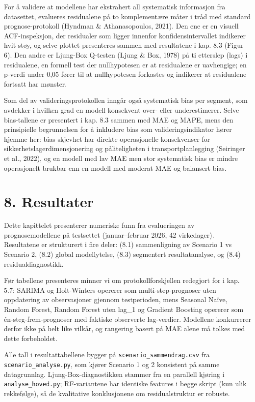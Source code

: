 \documentclass[
  norsk,
  11pt,
  a4paper,
]{article}
\begin{document}
For å validere at modellene har ekstrahert all systematisk informasjon
fra datasettet, evalueres residualene på to komplementære måter i tråd
med standard prognose-protokoll (Hyndman \& Athanasopoulos, 2021). Den
ene er en visuell ACF-inspeksjon, der residualer som ligger innenfor
konfidensintervallet indikerer hvit støy, og selve plottet presenteres
sammen med resultatene i kap. 8.3 (Figur 6). Den andre er Ljung-Box
Q-testen (Ljung \& Box, 1978) på ti etterslep (lags) i residualene, en
formell test der nullhypotesen er at residualene er uavhengige; en
p-verdi under 0,05 fører til at nullhypotesen forkastes og indikerer at
residualene fortsatt har mønster.

Som del av valideringsprotokollen inngår også systematisk bias per
segment, som avdekker i hvilken grad en modell konsekvent over- eller
underestimerer. Selve bias-tallene er presentert i kap. 8.3 sammen med
MAE og MAPE, mens den prinsipielle begrunnelsen for å inkludere bias som
validerings\-indikator hører hjemme her: bias-skjevhet har direkte
operasjonelle konsekvenser for sikkerhetslagerdimensjonering og
påliteligheten i transportplanlegging (Seiringer et al., 2022), og en
modell med lav MAE men stor systematisk bias er mindre operasjonelt
brukbar enn en modell med moderat MAE og balansert bias.

\section{8. Resultater}\label{resultater}

Dette kapittelet presenterer numeriske funn fra evalueringen av
prognosemodellene på testsettet (januar--februar 2026, 42 virkedager).
Resultatene er strukturert i fire deler: (8.1) sammenligning av Scenario
1 vs Scenario 2, (8.2) global modellytelse, (8.3) segmentert
resultatanalyse, og (8.4) residualdiagnostikk.

Før tabellene presenteres minner vi om protokollforskjellen redegjort
for i kap. 5.7: SARIMA og Holt-Winters opererer som multi-step-prognoser
uten oppdatering av observasjoner gjennom testperioden, mens Seasonal
Naïve, Random Forest, Random Forest uten lag\_1 og Gradient Boosting
opererer som én-steg-frem-prognoser med faktiske observerte lag-verdier.
Modellene konkurrerer derfor ikke på helt like vilkår, og rangering
basert på MAE alene må tolkes med dette forbeholdet.

Alle tall i resultattabellene bygger på
\texttt{scenario\_sammendrag.csv} fra \texttt{scenario\_analyse.py}, som
kjører Scenario 1 og 2 konsistent på samme datagrunnlag.
Ljung-Box-diagnostikken stammer fra en parallell kjøring i
\texttt{analyse\_hoved.py}; RF-variantene har identiske features i begge
skript (kun ulik rekkefølge), så de kvalitative konklusjonene om
residualstruktur er robuste.
\end{document}
